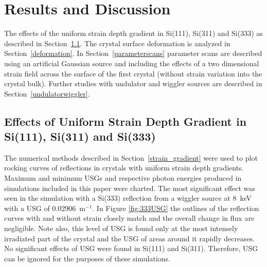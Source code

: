 \documentclass{iucr}
\begin{document}
\section{Results and Discussion}

The effects of the uniform strain depth gradient in Si(111), Si(311) and Si(333) as described in Section~\ref{strain_results}. The crystal surface deformation is analyzed in Section~\ref{deformation}. In Section~\ref{parameterscans} parameter scans are described using an artificial Gaussian source and including the effects of a two dimensional strain field across the surface of the first crystal (without strain variation into the crystal bulk). Further studies with undulator and wiggler sources are described in Section~\ref{undulatorwiggler}.

\subsection{Effects of Uniform Strain Depth Gradient in Si(111), Si(311) and Si(333)}\label{strain_results}
The numerical methods described in Section~\ref{strain_gradient} were used to plot rocking curves of reflections in crystals with uniform strain depth gradients. Maximum and minimum USGs and respective photon energies produced in simulations included in this paper were charted. The most significant effect was seen in the simulation with a Si(333) reflection from a wiggler source at 8~keV with a USG of 0.02906~m$^{-1}$. In Figure \ref{fig:333USG} the outlines of the reflection curves with and without strain closely match and the overall change in flux are negligible. Note also, this level of USG is found only at the most intensely irradiated part of the crystal and the USG of areas around it rapidly decreases. No significant effects of USG were found in Si(111) and Si(311). Therefore, USG can be ignored for the purposes of these simulations.

\end{document}
